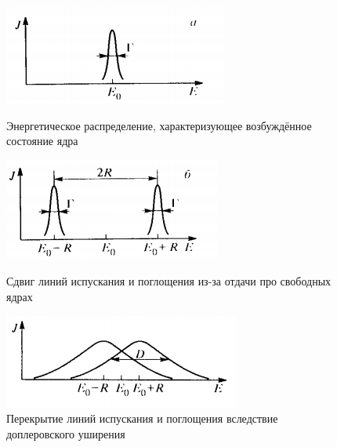\documentclass[a4paper]{article}
\begin{document}
\begin{figure}[h]
\begin{center}
\begin{minipage}[h]{0.3\linewidth}
\includegraphics[width=1\linewidth]{fig2.PNG}
\caption{Энергетическое распределение, характеризующее возбуждённое состояние ядра} %
\label{ris:experimoriginal} %
\end{minipage}
\hfill 
\begin{minipage}[h]{0.3\linewidth}
\includegraphics[width=1\linewidth]{fig4.PNG}
\caption{Сдвиг линий испускания и поглощения из-за отдачи про свободных ядрах}
\label{ris:experimcoded}
\end{minipage}
\hfill
\begin{minipage}[h]{0.3\linewidth}
\includegraphics[width=1\linewidth]{fig3.PNG}
\caption{Перекрытие линий испускания и поглощения вследствие доплеровского уширения} %
\label{ris:experimoriginal} %
\end{minipage}
\end{center}
\end{figure}
\end{document}

